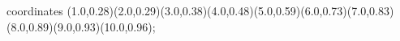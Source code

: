 					coordinates { (1.0,0.28)(2.0,0.29)(3.0,0.38)(4.0,0.48)(5.0,0.59)(6.0,0.73)(7.0,0.83)(8.0,0.89)(9.0,0.93)(10.0,0.96)};
